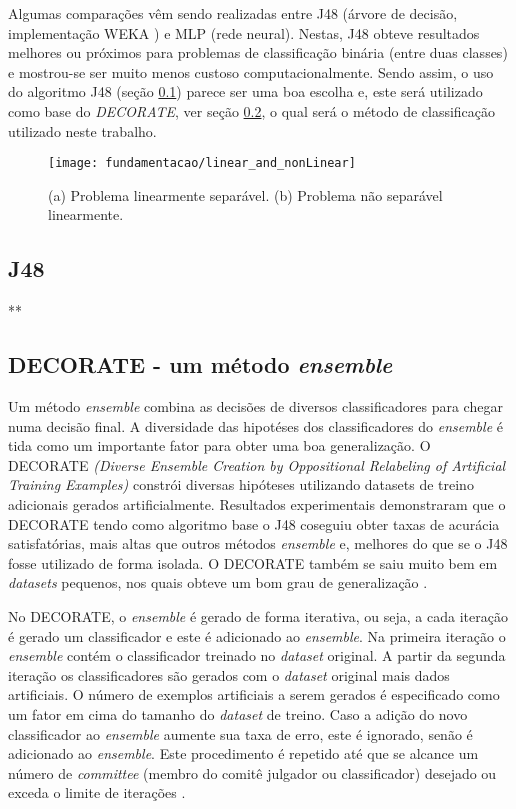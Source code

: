 Algumas comparações \cite{Firdausi:2010, Arora:2012, Karthikeyan:2013} vêm sendo realizadas entre J48 (árvore de decisão, implementação WEKA \cite{Hall:2009}) e MLP (rede neural). Nestas, J48 obteve resultados melhores ou próximos para problemas de classificação binária (entre duas classes) e mostrou-se ser muito menos custoso computacionalmente. Sendo assim, o uso do algoritmo J48 (seção \ref{subsec:j48}) parece ser uma boa escolha e, este será utilizado como base do \textit{DECORATE}, ver seção \ref{subsec:decoration}, o qual será o método de classificação utilizado neste trabalho.

\begin{figure}[!htb] \centering 
  \centering
  \texttt{[image: fundamentacao/linear\_and\_nonLinear]} 
  \caption{(a) Problema linearmente separável. (b) Problema não separável linearmente. \cite{Elizondo:2006}} 
  \label{fig:slseparablenonseparable}
\end{figure}

\subsection{J48}
\label{subsec:j48}
**

\subsection{DECORATE - um método \textit{ensemble}}
\label{subsec:decoration}
Um método \textit{ensemble} combina as decisões de diversos classificadores para chegar numa decisão final. A diversidade das hipotéses dos classificadores do \textit{ensemble} é tida como um importante fator para obter uma boa generalização. O DECORATE \textit{(Diverse Ensemble Creation by Oppositional Relabeling of Artificial Training Examples)} constrói diversas hipóteses utilizando datasets de treino adicionais gerados artificialmente. Resultados experimentais demonstraram que o DECORATE tendo como algoritmo base o J48 coseguiu obter taxas de acurácia satisfatórias, mais altas que outros métodos \textit{ensemble} e, melhores do que se o J48 fosse utilizado de forma isolada. O DECORATE também se saiu muito bem em \textit{datasets} pequenos, nos quais obteve um bom grau de generalização \cite{Melville:2003, Melville:2004}.

No DECORATE, o \textit{ensemble} é gerado de forma iterativa, ou seja, a cada iteração é gerado um classificador e este é adicionado ao \textit{ensemble}. Na primeira iteração o \textit{ensemble} contém o classificador treinado no \textit{dataset} original. A partir da segunda iteração os classificadores são gerados com o \textit{dataset} original mais dados artificiais. O número de exemplos artificiais a serem gerados é especificado como um fator em cima do tamanho do \textit{dataset} de treino. Caso a adição do novo classificador ao \textit{ensemble} aumente sua taxa de erro, este é ignorado, senão é adicionado ao \textit{ensemble}. Este procedimento é repetido até que se alcance um número de \textit{committee} (membro do comitê julgador ou classificador) desejado ou exceda o limite de iterações \cite{Melville:2003}.

